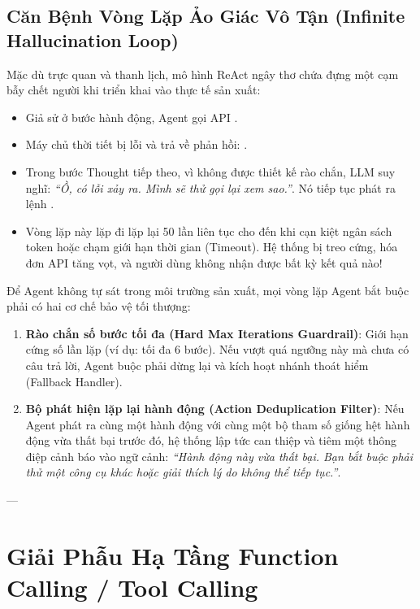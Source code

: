 \subsection{Căn Bệnh Vòng Lặp Ảo Giác Vô Tận (Infinite Hallucination Loop)}
Mặc dù trực quan và thanh lịch, mô hình ReAct ngây thơ chứa đựng một cạm bẫy chết người khi triển khai vào thực tế sản xuất:
\begin{itemize}
  \item Giả sử ở bước hành động, Agent gọi API .
  \item Máy chủ thời tiết bị lỗi và trả về phản hồi: .
  \item Trong bước Thought tiếp theo, vì không được thiết kế rào chắn, LLM suy nghĩ: \textit{``Ồ, có lỗi xảy ra. Mình sẽ thử gọi lại xem sao.''}. Nó tiếp tục phát ra lệnh .
  \item Vòng lặp này lặp đi lặp lại 50 lần liên tục cho đến khi cạn kiệt ngân sách token hoặc chạm giới hạn thời gian (Timeout). Hệ thống bị treo cứng, hóa đơn API tăng vọt, và người dùng không nhận được bất kỳ kết quả nào!
\end{itemize}

\begin{debugbox}
Để Agent không tự sát trong môi trường sản xuất, mọi vòng lặp Agent bắt buộc phải có hai cơ chế bảo vệ tối thượng:
\begin{enumerate}
  \item \textbf{Rào chắn số bước tối đa (Hard Max Iterations Guardrail)}: Giới hạn cứng số lần lặp (ví dụ: tối đa 6 bước). Nếu vượt quá ngưỡng này mà chưa có câu trả lời, Agent buộc phải dừng lại và kích hoạt nhánh thoát hiểm (Fallback Handler).
  \item \textbf{Bộ phát hiện lặp lại hành động (Action Deduplication Filter)}: Nếu Agent phát ra cùng một hành động với cùng một bộ tham số giống hệt hành động vừa thất bại trước đó, hệ thống lập tức can thiệp và tiêm một thông điệp cảnh báo vào ngữ cảnh: \textit{``Hành động này vừa thất bại. Bạn bắt buộc phải thử một công cụ khác hoặc giải thích lý do không thể tiếp tục.''}.
\end{enumerate}
\end{debugbox}

---

\section{Giải Phẫu Hạ Tầng Function Calling / Tool Calling}
\label{sec:tool-calling-internals}

